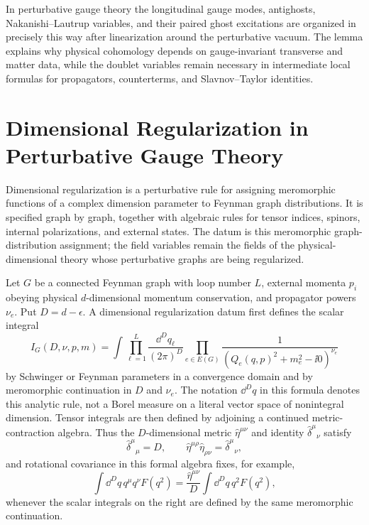 In perturbative gauge theory the longitudinal gauge modes, antighosts,
Nakanishi--Lautrup variables, and their paired ghost excitations are organized
in precisely this way after linearization around the perturbative vacuum.  The
lemma explains why physical cohomology depends on gauge-invariant transverse
and matter data, while the doublet variables remain necessary in intermediate
local formulas for propagators, counterterms, and Slavnov--Taylor identities.

\section{Dimensional Regularization in Perturbative Gauge Theory}

Dimensional regularization is a perturbative rule for assigning meromorphic
functions of a complex dimension parameter to Feynman graph distributions.  It
is specified graph by graph, together with algebraic rules for tensor indices,
spinors, internal polarizations, and external states.  The datum is this
meromorphic graph-distribution assignment; the field variables remain the
fields of the physical-dimensional theory whose perturbative graphs are being
regularized.

\begin{definition}
Let \(G\) be a connected Feynman graph with loop number \(L\), external
momenta \(p_i\) obeying physical \(d\)-dimensional momentum conservation, and
propagator powers \(\nu_e\).  Put \(D=d-\epsilon\).  A dimensional
regularization datum first defines the scalar integral
\[
  I_G(D,\nu,p,m)
  =
  \int
  \prod_{\ell=1}^L
  \frac{\dd^D q_\ell}{(2\pi)^D}
  \prod_{e\in E(G)}
  \frac{1}{(Q_e(q,p)^2+m_e^2-\ii0)^{\nu_e}}
\]
by Schwinger or Feynman parameters in a convergence domain and by meromorphic
continuation in \(D\) and \(\nu_e\).  The notation \(\dd^Dq\) in this formula
denotes this analytic rule, not a Borel measure on a literal vector space of
nonintegral dimension.  Tensor integrals are then defined by adjoining a
continued metric-contraction algebra.  Thus the \(D\)-dimensional metric
\(\hat\eta^{\mu\nu}\) and identity \(\hat\delta^\mu{}_\nu\) satisfy
\[
  \hat\delta^\mu{}_\mu=D,\qquad
  \hat\eta^{\mu\rho}\hat\eta_{\rho\nu}=\hat\delta^\mu{}_\nu,
\]
and rotational covariance in this formal algebra fixes, for example,
\[
  \int\dd^D q\,q^\mu q^\nu F(q^2)
  =
  \frac{\hat\eta^{\mu\nu}}{D}
  \int\dd^D q\,q^2F(q^2),
\]
whenever the scalar integrals on the right are defined by the same
meromorphic continuation.
\end{definition}

